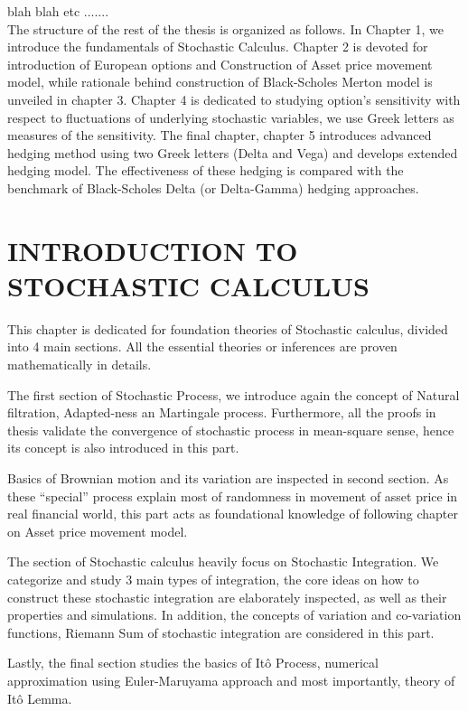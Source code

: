 \documentclass[12pt,a4paper,oneside]{book}
\begin{document}
	blah blah etc .......\\
	 
	The structure of the rest of the thesis is organized as follows. In Chapter 1, we introduce the fundamentals of Stochastic Calculus. Chapter 2 is devoted for introduction of European options and Construction of Asset price movement model, while rationale behind construction of Black-Scholes Merton model is unveiled in chapter 3. Chapter 4 is dedicated to studying option's sensitivity with respect to fluctuations of underlying stochastic variables, we use Greek letters as measures of the sensitivity. The final chapter, chapter 5 introduces advanced hedging method using two Greek letters (Delta and Vega) and develops extended hedging model. The effectiveness of these hedging is compared with the benchmark of Black-Scholes Delta (or Delta-Gamma) hedging approaches.  
	
	\newpage 
	\clearpage
	
	
	\chapter{INTRODUCTION TO STOCHASTIC CALCULUS}
	This chapter is dedicated for foundation theories of Stochastic calculus, divided into 4 main sections. All the essential theories or inferences are proven mathematically in details. 
	
	The first section of Stochastic Process, we introduce again the concept of Natural filtration, Adapted-ness an Martingale process. Furthermore, all the proofs in thesis validate the convergence of stochastic process in mean-square sense, hence its concept is also introduced in this part. 
	
	Basics of Brownian motion and its variation are inspected in second section. As these ``special'' process explain most of randomness in movement of asset price in real financial world, this part acts as foundational knowledge of following chapter on Asset price movement model. 
	
	The section of Stochastic calculus heavily focus on Stochastic Integration. We categorize and study 3 main types of integration, the core ideas on how to construct these stochastic integration are elaborately inspected, as well as their properties and simulations. In addition, the concepts of variation and co-variation functions, Riemann Sum of stochastic integration are considered in this part. 
	
	Lastly, the final section studies the basics of It\^o Process, numerical approximation using Euler-Maruyama approach and most importantly, theory of It\^o Lemma. 
	
\end{document}
